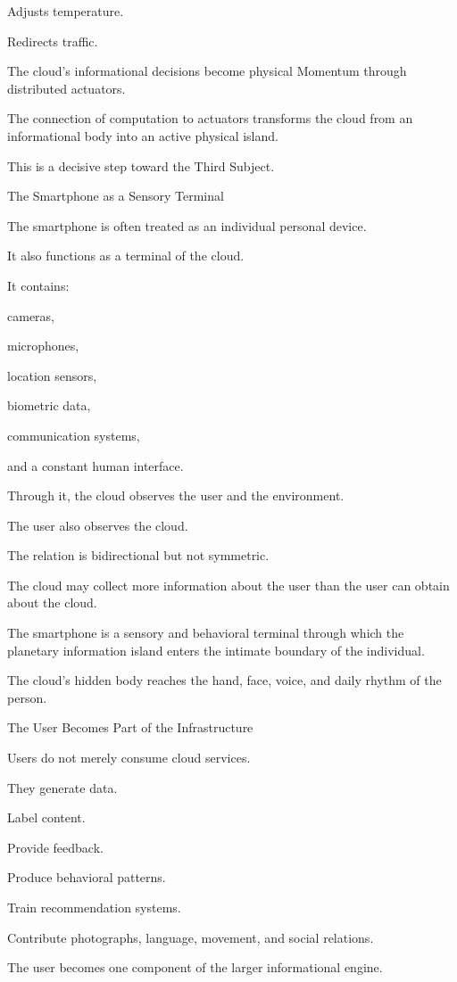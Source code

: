 Adjusts temperature.

Redirects traffic.

The cloud’s informational decisions become physical Momentum through distributed actuators.

The connection of computation to actuators transforms the cloud from an informational body into an active physical island.

This is a decisive step toward the Third Subject.

The Smartphone as a Sensory Terminal

The smartphone is often treated as an individual personal device.

It also functions as a terminal of the cloud.

It contains:

cameras,

microphones,

location sensors,

biometric data,

communication systems,

and a constant human interface.

Through it, the cloud observes the user and the environment.

The user also observes the cloud.

The relation is bidirectional but not symmetric.

The cloud may collect more information about the user than the user can obtain about the cloud.

The smartphone is a sensory and behavioral terminal through which the planetary information island enters the intimate boundary of the individual.

The cloud’s hidden body reaches the hand, face, voice, and daily rhythm of the person.

The User Becomes Part of the Infrastructure

Users do not merely consume cloud services.

They generate data.

Label content.

Provide feedback.

Produce behavioral patterns.

Train recommendation systems.

Contribute photographs, language, movement, and social relations.

The user becomes one component of the larger informational engine.

